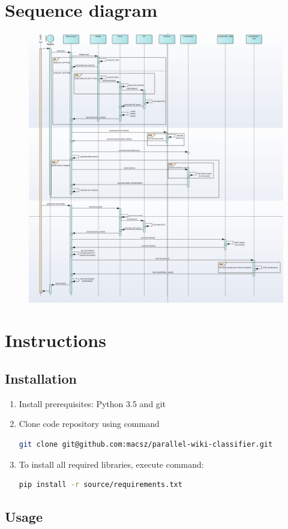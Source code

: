 \chapter{Sequence diagram} \label{appendix-sequence}
\begin{figure}[h]
	\begin{center}
		\includegraphics[width=1.2\linewidth]{images/diagrams/seq-full.png}
		\label{appendix-sequence-diagram}
	\end{center}
\end{figure}


\chapter{Instructions}
\section{Installation}
\begin{enumerate}
	\item Install prerequisites: Python 3.5 and git
	\item Clone code repository using command
\begin{lstlisting}[language=Bash, numbers=none]
git clone git@github.com:macsz/parallel-wiki-classifier.git
\end{lstlisting}
	\item To install all required libraries, execute command:
\begin{lstlisting}[language=Bash, numbers=none]
pip install -r source/requirements.txt
\end{lstlisting}
\end{enumerate}
\section{Usage}